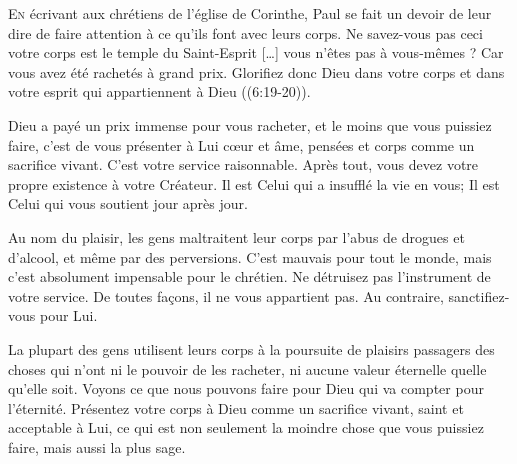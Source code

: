 



\lettrine{E}{n} écrivant aux chrétiens de l'église de Corinthe,
 Paul se fait un devoir de leur dire de faire attention à ce qu'ils
 font avec leurs corps.
 \Og Ne savez-vous pas ceci\frcolon{} votre corps est le temple du Saint-Esprit
 [\dots{}] vous n'êtes pas à vous-mêmes ?
 Car vous avez été rachetés à grand prix. Glorifiez donc Dieu
 dans votre corps et dans votre esprit qui appartiennent à Dieu \Fg{}
 ((6:19-20)).

Dieu a payé un prix immense pour vous racheter,
 et le moins que vous puissiez faire, c'est de vous présenter à Lui
 \ocadr c\oe{}ur et âme, pensées et corps \fcadr{} comme un sacrifice vivant.
 C'est votre service raisonnable. Après tout, vous devez votre propre
 existence à votre Créateur. Il est Celui qui a insufflé la vie en vous;
 Il est Celui qui vous soutient jour après jour.


Au nom du plaisir, les gens maltraitent leur corps par l'abus de drogues
 et d'alcool, et même par des perversions. 
 C'est mauvais pour tout le monde,
 mais c'est absolument impensable pour le chrétien.
 Ne détruisez pas l'instrument de votre service. De toutes fa\c{c}ons,
 il ne vous appartient pas. Au contraire, sanctifiez-vous pour Lui.

La plupart des gens utilisent leurs corps à la poursuite de plaisirs passagers
 \ocadr des choses qui n'ont ni le pouvoir de les racheter, ni aucune valeur éternelle
 quelle qu'elle soit. Voyons ce que nous pouvons faire pour Dieu qui va compter
 pour l'éternité. Présentez votre corps à Dieu comme un sacrifice vivant,
 saint et acceptable à Lui, ce qui est non seulement la moindre chose
 que vous puissiez faire, mais aussi la plus sage.

